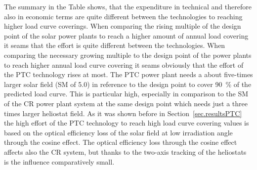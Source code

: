 The summary in the Table shows, that the expenditure in technical and therefore also in economic terms are quite different between the technologies to reaching higher load curve coverings. When comparing the rising multiple of the design point of the solar power plants to reach a higher amount of annual load covering it seams that the effort is quite different between the technologies. When comparing the necessary growing multiple to the design point of the power plants to reach higher annual load curve covering it seams obviously that the effort of the PTC technology rises at most. The PTC power plant needs a about five-times larger solar field (SM of 5.0) in reference to the design point to cover 90~\% of the predicted load curve. This is particular high, especially in comparison to the SM of the CR power plant system at the same design point which needs just a three times larger heliostat field. As it was shown before in Section~\ref{sec.resultsPTC} the high effort of the PTC technology to reach high load curve covering values is based on the optical efficiency loss of the solar field at low irradiation angle through the cosine effect. The optical efficiency loss through the cosine effect affects also the CR system, but thanks to the two-axis tracking of the heliostats is the influence comparatively small. 

